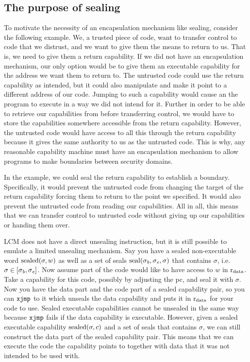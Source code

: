 \documentclass[acmsmall,screen]{acmart}\settopmatter{}
\newcommand{\trgcm}{\textsc{LCM}}
\newenvironment{jversion}%
    {\color{OliveGreen}}{}
\begin{document}
\begin{jversion}
  \subsection{The purpose of sealing}
  \label{sec:purpose-sealing}
  To motivate the necessity of an encapsulation mechanism like sealing, consider the following example.
  We, a trusted piece of code, want to transfer control to code that we distrust, and we want to give them the means to return to us.
  That is, we need to give them a return capability.
  If we did not have an encapsulation mechanism, our only option would be to give them an executable capability for the address we want them to return to.
  The untrusted code could use the return capability as intended, but it could also manipulate and make it point to a different address of our code.
  Jumping to such a capability would cause an the program to execute in a way we did not intend for it.
  Further in order to be able to retrieve our capabilities from before transferring control, we would have to store the capabilities somewhere accessible from the return capability.
  However, the untrusted code would have access to all this through the return capability because it gives the same authority to us as the untrusted code.
  This is why, any reasonable capability machine must have an encapsulation mechanism to allow programs to make boundaries between security domains.
  
  In the example, we could seal the return capability to establish a boundary.
  Specifically, it would prevent the untrusted code from changing the target of the return capability forcing them to return to the point we specified.
  It would also prevent the untrusted code from reading our capabilities.
  All in all, this means that we can transfer control to untrusted code without giving up our capabilities or handing them over.

  \trgcm{} does not have a direct unsealing instruction, but it is still possible to emulate a limited unsealing mechanism.
  Say you have a sealed non-executable word $\mathrm{sealed}(\sigma,w)$ as well as a set of seals $\mathrm{seal}(\sigma_{\mathit{b}},\sigma_{\mathit{e}}, \sigma)$ that contains $\sigma$, i.e.\ $\sigma \in [\sigma_{\mathit{b}},\sigma_{\mathit{e}}]$.
  Now assume part of the code would like to have access to $w$ in $\mathrm{r}_\mathrm{data}$.
  Take a capability for this code, possibly by adjusting the pc, and seal it with $\sigma$.
  Now you have the data part and the code part of a sealed capability pair, so you can $\txjmp{}{}$ to it which unseals the data capability and puts it in $\mathrm{r}_\mathrm{data}$ for your code to use.
  Sealed executable capabilities cannot be unsealed in the same way because $\txjmp{}{}$ fails if the data capability is executable.
  However, given a sealed executable capability $\mathrm{sealed}(\sigma,c)$ and a set of seals that contains $\sigma$, we can still construct the data part of the sealed capability pair.
  This means that we can execute the code the capability points to together with data that it was not intended to be used with.


\end{jversion}
\end{document}
